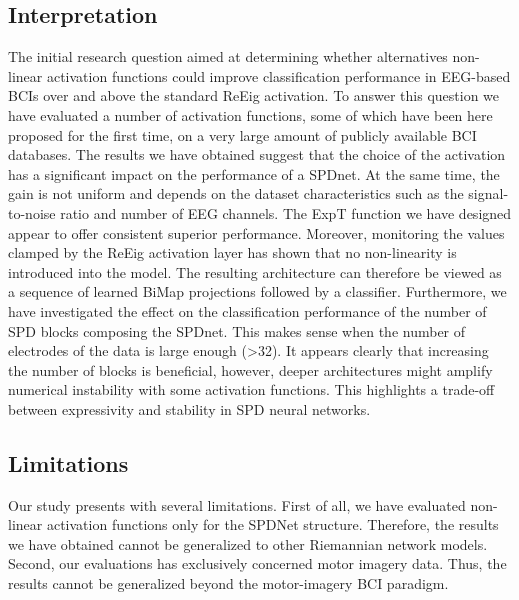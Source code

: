 \documentclass[11pt,a4paper]{article}
\begin{document}
\subsection{Interpretation}
The initial research question aimed at determining whether alternatives non-linear activation functions could improve classification performance in EEG-based BCIs over and above the standard ReEig activation. To answer this question we have evaluated a number of activation functions, some of which have been here proposed for the first time, on a very large amount of publicly available BCI databases. The results we have obtained suggest that the choice of the activation has a significant impact on the performance of a SPDnet. At the same time, the gain is not uniform and depends on the dataset characteristics such as the signal-to-noise ratio and number of EEG channels. The ExpT function we have designed appear to offer consistent superior performance. Moreover, monitoring the values clamped by the ReEig activation layer has shown that no non-linearity is introduced into the model. The resulting architecture can therefore be viewed as a sequence of learned BiMap projections followed by a classifier.
Furthermore, we have investigated the effect on the classification performance of the number of SPD blocks composing the SPDnet. This makes sense when the number of electrodes of the data is large enough (>32).
It appears clearly that increasing the number of blocks is beneficial, however, deeper architectures might amplify numerical instability with some activation functions.
This highlights a trade-off between expressivity and stability in SPD neural networks. 

\subsection{Limitations}
Our study presents with several limitations. First of all, we have evaluated non-linear activation functions only for the SPDNet structure. Therefore, the results we have obtained cannot be generalized to other Riemannian network models. Second, our evaluations has exclusively concerned motor imagery data.
Thus, the results cannot be generalized beyond the motor-imagery BCI paradigm. 
\end{document}
